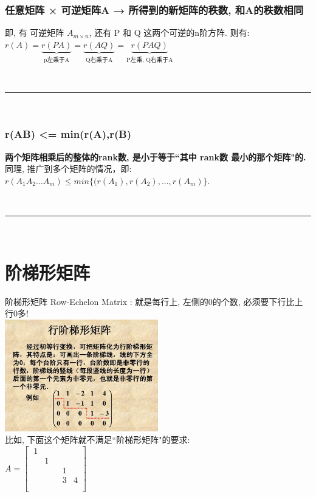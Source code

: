 \documentclass[UTF8]{ctexart}
\begin{document}
\subsubsection{任意矩阵 × 可逆矩阵A  → 所得到的新矩阵的秩数, 和A的秩数相同}

即, 有 可逆矩阵 $ A_{m \times n}$, 还有 P 和 Q 这两个可逆的n阶方阵. 则有:\\
$r\left( A \right) =\underset{\text{p左乘于A}}{\underbrace{r\left( PA \right) }}=\underset{\text{Q右乘于A}}{\underbrace{r\left( AQ \right) }}=\underset{\text{P左乘, Q右乘于A}}{\underbrace{r\left( PAQ \right) }}$


~\\
\hrule
~\\


\subsubsection{r(AB) <= min{(r(A),r(B)}}

\textbf{两个矩阵相乘后的整体的rank数, 是小于等于``其中 rank数 最小的那个矩阵"的.} \\
同理, 推广到多个矩阵的情况，即: $ r(A_1 A_2 ... A_m) \leq min\{(r(A_1),r(A_2),...,r(A_m)\}$.


~\\
\hrule
~\\

\section{阶梯形矩阵}

阶梯形矩阵 Row-Echelon Matrix : 就是每行上, 左侧的0的个数, 必须要下行比上行0多!\\

\includegraphics[width=0.5\textwidth]{img/0063.jpg}\\


比如, 下面这个矩阵就不满足``阶梯形矩阵"的要求:  \\
$A=\left[ \begin{matrix}\
	1&		&		&		&		\\
	&		1&		&		&		\\
	&		&		&		1&		\\
	&		&		&		3&		4\\
	&		&		&		&		\\
\end{matrix} \right]$\\
\end{document}
